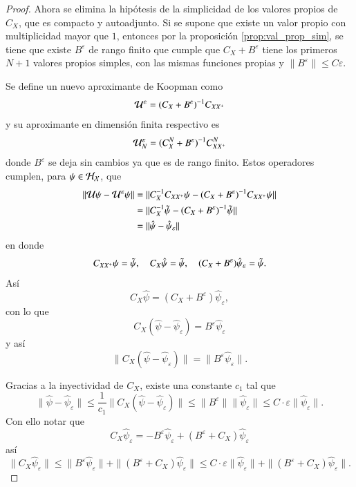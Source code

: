 \begin{proof}
    Ahora se elimina la hipótesis de la simplicidad de los valores propios de $C_X$, que es compacto y autoadjunto. Si se supone que existe un valor propio con multiplicidad mayor que $1$, entonces por la proposición \ref{prop:val_prop_sim}, se tiene que existe $B^\varepsilon$ de rango finito que cumple que $C_X + B^\varepsilon$ tiene los primeros $N+1$ valores propios simples, con las mismas funciones propias y $\| B^\varepsilon \| \leq C \varepsilon$. 

    Se define un nuevo aproximante de Koopman como
    \[
    \mathcal{U}^\varepsilon = (C_X + B^\varepsilon)^{-1} C_{XX^+}
    \]
    y su aproximante en dimensión finita respectivo es
    \[
    \mathcal{U}^\varepsilon_N = (C_X^N + B^\varepsilon)^{-1} C_{XX^+}^N
    \]
    donde $B^\varepsilon$ se deja sin cambios ya que es de rango finito. Estos operadores cumplen, para $\psi \in \mathcal{H}_{\mathcal{X}}$, que
    \[
    \begin{aligned}
        \| \mathcal{U}\psi - \mathcal{U}^\varepsilon\psi \| & = \| C_X^{-1} C_{XX^+} \psi - (C_X + B^\varepsilon)^{-1} C_{XX^+} \psi \| \\
        & = \| C_X^{-1} \Tilde{\psi} - (C_X + B^\varepsilon)^{-1} \Tilde{\psi} \| \\
        & = \| \hat{\psi} - \hat{\psi}_\varepsilon \|
    \end{aligned} 
    \]
    en donde
    \[
    C_{XX^+}\psi = \Tilde{\psi}, \quad C_X \hat{\psi} =  \Tilde{\psi}, \quad (C_X + B^\varepsilon)\hat{\psi}_\varepsilon = \Tilde{\psi}.
    \]
    Así
    \[
    C_X \hat{\psi} = (C_X + B^\varepsilon)\hat{\psi}_\varepsilon,
    \]
    con lo que
    \[
    C_X (\hat{\psi} - \hat{\psi}_\varepsilon) = B^\varepsilon \hat{\psi}_\varepsilon
    \]
    y así
    \[
    \|C_X (\hat{\psi} - \hat{\psi}_\varepsilon)\| = \|B^\varepsilon \hat{\psi}_\varepsilon\|.
    \]

    Gracias a la inyectividad de $C_X$, existe una constante $c_1$ tal que 
    \[
    \| \hat{\psi} - \hat{\psi}_\varepsilon \| \leq \frac{1}{c_1} \| C_X (\hat{\psi} - \hat{\psi}_\varepsilon) \| \leq \| B^\varepsilon \| \| \hat{\psi}_\varepsilon \| \leq C \cdot \varepsilon \| \hat{\psi}_\varepsilon \|. 
    \]
    Con ello notar que
    \[
    C_X \hat{\psi}_\varepsilon  = -B^\varepsilon \hat{\psi}_\varepsilon  + (B^\varepsilon + C_X)\hat{\psi}_\varepsilon
    \]
    así
    \[
    \| C_X \hat{\psi}_\varepsilon \| \leq \| B^\varepsilon \hat{\psi}_\varepsilon \| + \| (B^\varepsilon + C_X)\hat{\psi}_\varepsilon\| \leq C \cdot \varepsilon  \| \hat{\psi}_\varepsilon \| + \| (B^\varepsilon + C_X)\hat{\psi}_\varepsilon\|. 
    \]
    

\end{proof}
